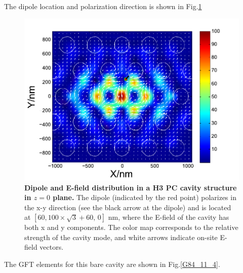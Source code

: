 The dipole location and polarization direction is shown in Fig.\ref{dotsmode1_2}
\begin{figure}[H]
\centering
\begin{center}
\includegraphics[width=14cm]{./Figs/dotsmode1_2}
\end{center}
\caption[Dipole and E-field distributions in a H3 PC cavity structure.]{\textbf{  Dipole and E-field distribution in a H3 PC cavity structure in $z=0$ plane.}  The dipole (indicated by the red point) polarizes in the x-y direction (see the black arrow at the dipole) and is located at $[60,100\times\sqrt{3}+60,\, 0]$ nm, where the E-field of the cavity has both x and y components. The color map corresponds to the relative strength of the cavity mode, and white arrows indicate on-site E-field vectors.}
\label{dotsmode1_2}
\end{figure}
The GFT elements for this bare cavity are shown in Fig.\ref{G84_11_4}.
